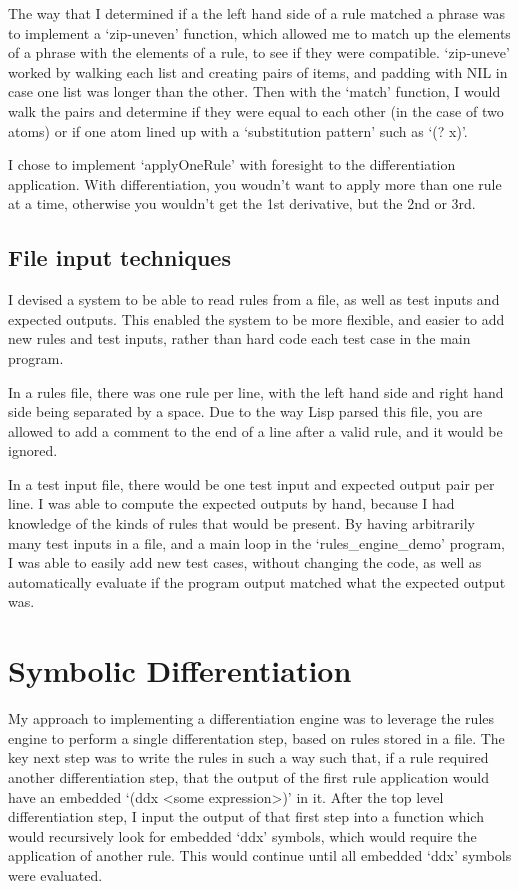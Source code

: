 \documentclass[letterpaper]{article}
\begin{document}
The way that I determined if a the left hand side of a rule matched a phrase
was to implement a `zip-uneven' function, which allowed me to match up the
elements of a phrase with the elements of a rule, to see if they were compatible.
`zip-uneve' worked by walking each list and creating pairs of items, and padding
with NIL in case one list was longer than the other. Then with the `match' function,
I would walk the pairs and determine if they were equal to each other (in the case of 
two atoms) or if one atom lined up with a `substitution pattern' such as `(? x)'.

I chose to implement `applyOneRule' with foresight to the differentiation application.
With differentiation, you woudn't want to apply more than one rule at a time, otherwise
you wouldn't get the 1st derivative, but the 2nd or 3rd.


\subsection{File input techniques}
I devised a system to be able to read rules from a file, as well as test
inputs and expected outputs. This enabled the system to be more flexible, and
easier to add new rules and test inputs, rather than hard code each test case
in the main program.

In a rules file, there was one rule per line, with the left hand side and right hand side
being separated by a space. Due to the way Lisp parsed this file, you are allowed to add a
comment to the end of a line after a valid rule, and it would be ignored.

In a test input file, there would be one test input and expected output pair per line.
I was able to compute the expected outputs by hand, because I had knowledge of the kinds of
rules that would be present. By having arbitrarily many test inputs in a file, and a
main loop in the `rules_engine_demo' program, I was able to easily add new test cases,
without changing the code, as well as automatically evaluate if the program output
matched what the expected output was.

\section{Symbolic Differentiation}

My approach to implementing a differentiation engine was to leverage the rules engine
to perform a single differentation step, based on rules stored in a file. The key
next step was to write the rules in such a way such that, if a rule required
another differentiation step, that the output of the first rule application would have
an embedded `(ddx <some expression>)' in it. After the top level differentiation step,
I input the output of that first step into a function which would recursively look
for embedded `ddx' symbols, which would require the application of another rule.
This would continue until all embedded `ddx' symbols were evaluated.
\end{document}
